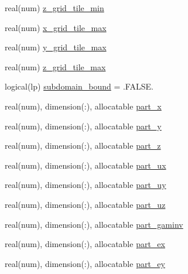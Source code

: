 \begin{DoxyCompactItemize}
\item 
real(num) \hyperlink{structparticle__tilemodule_1_1particle__tile_af4027ac6934ec98e941ce147cd914217}{z\+\_\+grid\+\_\+tile\+\_\+min}
\item 
real(num) \hyperlink{structparticle__tilemodule_1_1particle__tile_afa71688c8ff9a3c496122a637a222a18}{x\+\_\+grid\+\_\+tile\+\_\+max}
\item 
real(num) \hyperlink{structparticle__tilemodule_1_1particle__tile_a76acb784951c7e262aa708082ce0d3fa}{y\+\_\+grid\+\_\+tile\+\_\+max}
\item 
real(num) \hyperlink{structparticle__tilemodule_1_1particle__tile_a8536ab5672b968d25265efbb85fbcfbf}{z\+\_\+grid\+\_\+tile\+\_\+max}
\item 
logical(lp) \hyperlink{structparticle__tilemodule_1_1particle__tile_a230aae5dde9dba28ac64fe9097349655}{subdomain\+\_\+bound} = .F\+A\+L\+S\+E.
\item 
real(num), dimension(\+:), allocatable \hyperlink{structparticle__tilemodule_1_1particle__tile_a161fbd3d02d9b739c8f3608b2ed659f1}{part\+\_\+x}
\item 
real(num), dimension(\+:), allocatable \hyperlink{structparticle__tilemodule_1_1particle__tile_a4737a3e12255f57ce90d91c63a4e1f63}{part\+\_\+y}
\item 
real(num), dimension(\+:), allocatable \hyperlink{structparticle__tilemodule_1_1particle__tile_a8d89102d9a0d26ea7b4f201737bb6096}{part\+\_\+z}
\item 
real(num), dimension(\+:), allocatable \hyperlink{structparticle__tilemodule_1_1particle__tile_ae5bebe1676b35c5418336285a1dbbf39}{part\+\_\+ux}
\item 
real(num), dimension(\+:), allocatable \hyperlink{structparticle__tilemodule_1_1particle__tile_ab116cce90400a29ced69cdcc8cf7a8eb}{part\+\_\+uy}
\item 
real(num), dimension(\+:), allocatable \hyperlink{structparticle__tilemodule_1_1particle__tile_a7722a4567fe41c4f1753bc39f82608d4}{part\+\_\+uz}
\item 
real(num), dimension(\+:), allocatable \hyperlink{structparticle__tilemodule_1_1particle__tile_ace7d68b2ee792fed473a1020a8ba6f11}{part\+\_\+gaminv}
\item 
real(num), dimension(\+:), allocatable \hyperlink{structparticle__tilemodule_1_1particle__tile_a04d02a945821c7c9863f95bbef4585ec}{part\+\_\+ex}
\item 
real(num), dimension(\+:), allocatable \hyperlink{structparticle__tilemodule_1_1particle__tile_af8b4a1cc1be4fa07c6d831943982de0c}{part\+\_\+ey}

\end{DoxyCompactItemize}
